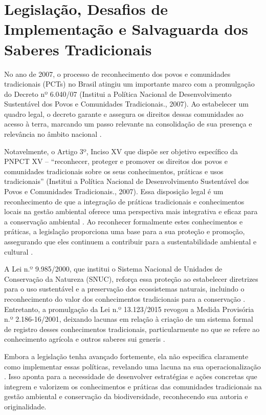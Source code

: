 \section{Legislação, Desafios de Implementação e Salvaguarda dos Saberes Tradicionais}


No ano de 2007, o processo de reconhecimento dos povos e comunidades tradicionais (PCTs) no Brasil atingiu um importante marco com a promulgação do Decreto nº 6.040/07 (Institui a Política Nacional de Desenvolvimento Sustentável dos Povos e Comunidades Tradicionais., 2007). Ao estabelecer um quadro legal, o decreto garante e assegura os direitos dessas comunidades ao acesso à terra, marcando um passo relevante na consolidação de sua presença e relevância no âmbito nacional \cite{Yustiningrum2023}.

Notavelmente, o Artigo 3º, Inciso XV que dispõe ser objetivo específico da PNPCT XV – “reconhecer, proteger e promover os direitos dos povos e comunidades tradicionais sobre os seus conhecimentos, práticas e usos tradicionais” (Institui a Política Nacional de Desenvolvimento Sustentável dos Povos e Comunidades Tradicionais., 2007). Essa disposição legal é um reconhecimento de que a integração de práticas tradicionais e conhecimentos locais na gestão ambiental oferece uma perspectiva mais integrativa e eficaz para a conservação ambiental \cite{Ciocco2023}. Ao reconhecer formalmente estes conhecimentos e práticas, a legislação proporciona uma base para a sua proteção e promoção, assegurando que eles continuem a contribuir para a sustentabilidade ambiental e cultural \cite{Reyes-Garca2019}. 

A Lei n.º 9.985/2000, que institui o Sistema Nacional de Unidades de Conservação da Natureza (SNUC), reforça essa proteção ao estabelecer diretrizes para o uso sustentável e a preservação dos ecossistemas naturais, incluindo o reconhecimento do valor dos conhecimentos tradicionais para a conservação  \cite{Brasil2015}. Entretanto, a promulgação da Lei n.º 13.123/2015 revogou a Medida Provisória n.º 2.186-16/2001, deixando lacunas em relação à criação de um sistema formal de registro desses conhecimentos tradicionais, particularmente no que se refere ao conhecimento agrícola e outros saberes sui generis \cite{Gomes2016}.

Embora a legislação tenha avançado fortemente, ela não especifica claramente como implementar essas políticas, revelando uma lacuna na sua operacionalização \cite{Tsai2020}. Isso aponta para a necessidade de desenvolver estratégias e ações concretas que integrem e valorizem os conhecimentos e práticas das comunidades tradicionais na gestão ambiental e conservação da biodiversidade, reconhecendo sua autoria e originalidade.

